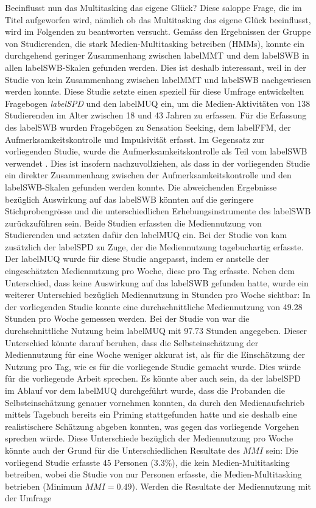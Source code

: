 Beeinflusst nun das Multitasking das eigene Glück? Diese saloppe Frage, die im Titel aufgeworfen wird, nämlich ob das Multitasking das eigene Glück beeinflusst, wird im Folgenden zu beantworten versucht. Gemäss den Ergebnissen der Gruppe von Studierenden, die stark Medien-Multitasking betreiben (HMMs), konnte ein durchgehend geringer Zusammenhang zwischen \gls{labelMMT} und dem \gls{labelSWB} in allen \gls{labelSWB}-Skalen gefunden werden. Dies ist deshalb interessant, weil in der Studie von  kein Zusammenhang zwischen \gls{labelMMT} und \gls{labelSWB} nachgewiesen werden konnte. Diese Studie setzte einen speziell für diese Umfrage entwickelten Fragebogen \textit{\gls{labelSPD}} und den \gls{labelMUQ} ein, um die Medien-Aktivitäten von 138 Studierenden im Alter zwischen 18 und 43 Jahren zu erfassen. Für die Erfassung des \gls{labelSWB} wurden Fragebögen zu Sensation Seeking, dem \gls{labelFFM}, der Aufmerksamkeitskontrolle und Impulsivität erfasst. Im Gegensatz zur vorliegenden Studie, wurde die Aufmerksamkeitskontrolle als Teil vom \gls{labelSWB} verwendet \cite{Fergus2012}. Dies ist insofern nachzuvollziehen, als dass in der vorliegenden Studie ein direkter Zusammenhang zwischen der Aufmerksamkeitskontrolle und den \gls{labelSWB}-Skalen gefunden werden konnte. Die abweichenden Ergebnisse bezüglich Auswirkung auf das \gls{labelSWB} könnten auf die geringere Stichprobengrösse und die unterschiedlichen Erhebungsinstrumente des \gls{labelSWB} zurückzuführen sein. Beide Studien erfassten die Mediennutzung von Studierenden und setzten dafür den \gls{labelMUQ} ein. Bei der Studie von \citeauthor{Shih2013} kam zusätzlich der \gls{labelSPD} zu Zuge, der die Mediennutzung tagebuchartig erfasste. Der \gls{labelMUQ} wurde für diese Studie angepasst, indem er anstelle der eingeschätzten Mediennutzung pro Woche, diese pro Tag erfasste. Neben dem Unterschied, dass  keine Auswirkung auf das \gls{labelSWB} gefunden hatte, wurde ein weiterer Unterschied bezüglich Mediennutzung in Stunden pro Woche sichtbar: In der vorliegenden Studie konnte eine durchschnittliche Mediennutzung von 49.28 Stunden pro Woche gemessen werden. Bei der Studie von \citeauthor{Shih2013} war die durchschnittliche Nutzung beim \gls{labelMUQ} mit 97.73 Stunden angegeben. Dieser Unterschied könnte darauf beruhen, dass die Selbsteinschätzung der Mediennutzung für eine Woche weniger akkurat ist, als für die Einschätzung der Nutzung pro Tag, wie es für die vorliegende Studie gemacht wurde. Dies würde für die vorliegende Arbeit sprechen. Es könnte aber auch sein, da der \gls{labelSPD} im Ablauf vor dem \gls{labelMUQ} durchgeführt wurde, dass die Probanden die Selbsteinschätzung genauer vornehmen konnten, da durch den Medienaufschrieb mittels Tagebuch bereits ein Priming stattgefunden hatte und sie deshalb eine realistischere Schätzung abgeben konnten, was gegen das vorliegende Vorgehen sprechen würde. Diese Unterschiede bezüglich der Mediennutzung pro Woche könnte auch der Grund für die Unterschiedlichen Resultate des $MMI$ sein: Die vorliegend Studie erfasste 45 Personen (3.3\%), die kein Medien-Multitasking betreiben, wobei die Studie von  nur Personen erfasste, die Medien-Multitasking betrieben (Minimum $MMI = 0.49$). Werden die Resultate der Mediennutzung mit der Umfrage 